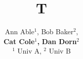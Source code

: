 \documentclass{article}
\begin{document}
\title{T}
\author{Ann Able$^{1}$, \quad Bob Baker$^{2}$, \quad \\
\textbf{Cat Cole$^{1}$, \quad}
\vspace{0.2cm}
\textbf{Dan Dorn$^{2}$} \\
$^{1}$ Univ A, $^{2}$ Univ B}
\maketitle
\end{document}
